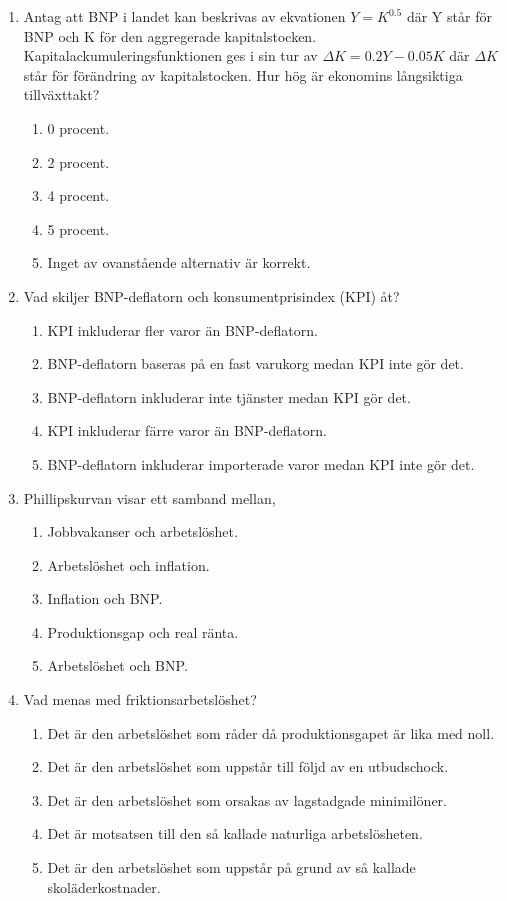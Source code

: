 \documentclass[12pt,a4paper]{article}
\begin{document}
\begin{enumerate}[label=\arabic*.]
    \item Antag att BNP i landet kan beskrivas av ekvationen $Y = K^{0.5}$ där Y står för BNP och K för den aggregerade kapitalstocken. Kapitalackumuleringsfunktionen ges i sin tur av $\Delta K = 0.2Y - 0.05K$ där $\Delta K$ står för förändring av kapitalstocken. Hur hög är ekonomins långsiktiga tillväxttakt?
    \begin{enumerate}[label=\alph*)]
        \item 0 procent.
        \item 2 procent.
        \item 4 procent.
        \item 5 procent.
        \item Inget av ovanstående alternativ är korrekt.
    \end{enumerate}

    \item Vad skiljer BNP-deflatorn och konsumentprisindex (KPI) åt?
    \begin{enumerate}[label=\Alph*.]
        \item KPI inkluderar fler varor än BNP-deflatorn.
        \item BNP-deflatorn baseras på en fast varukorg medan KPI inte gör det.
        \item BNP-deflatorn inkluderar inte tjänster medan KPI gör det.
        \item KPI inkluderar färre varor än BNP-deflatorn.
        \item BNP-deflatorn inkluderar importerade varor medan KPI inte gör det.
    \end{enumerate}

    \item Phillipskurvan visar ett samband mellan,
    \begin{enumerate}[label=\Alph*.]
        \item Jobbvakanser och arbetslöshet.
        \item Arbetslöshet och inflation.
        \item Inflation och BNP.
        \item Produktionsgap och real ränta.
        \item Arbetslöshet och BNP.
    \end{enumerate}

    \item Vad menas med friktionsarbetslöshet?
    \begin{enumerate}[label=\Alph*.]
        \item Det är den arbetslöshet som råder då produktionsgapet är lika med noll.
        \item Det är den arbetslöshet som uppstår till följd av en utbudschock.
        \item Det är den arbetslöshet som orsakas av lagstadgade minimilöner.
        \item Det är motsatsen till den så kallade naturliga arbetslösheten.
        \item Det är den arbetslöshet som uppstår på grund av så kallade skoläderkostnader.
    \end{enumerate}


\end{enumerate}
\end{document}
